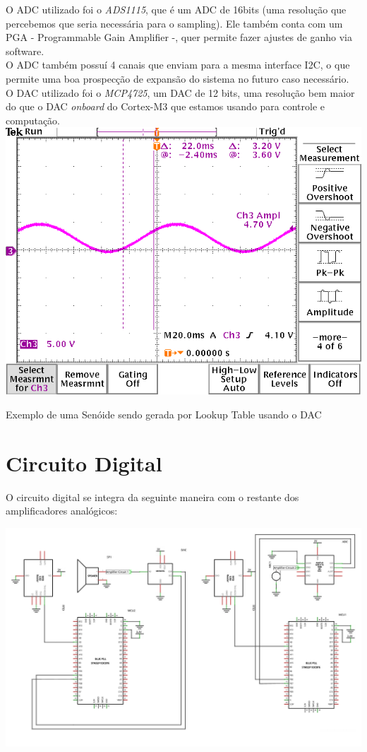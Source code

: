 \documentclass[12pt,a4paper]{report}
\begin{document}
	O ADC utilizado foi o {\it ADS1115}, que é um ADC de 16bits (uma resolução que percebemos que seria necessária para o sampling). Ele também conta com um PGA - Programmable Gain Amplifier -, quer permite fazer ajustes de ganho via software.\\
	
	O ADC também possuí 4 canais que enviam para a mesma interface I2C, o que permite uma boa prospecção de expansão do sistema no futuro caso necessário.\\
	
	O DAC utilizado foi o {\it MCP4725}, um DAC de 12 bits, uma resolução bem maior do que o DAC {\it onboard} do Cortex-M3 que estamos usando para controle e computação.\\
	
	\includegraphics[scale = 0.5]{TEK00000}
	\begin{center}
		\footnotesize{Exemplo de uma Senóide sendo gerada por Lookup Table usando o DAC}
	\end{center}
	\section{Circuito Digital}
	O circuito digital se integra da seguinte maneira com o restante dos amplificadores analógicos:
	
	\includegraphics[angle=90,origin=c]{digitaln.pdf}
	
\end{document}
